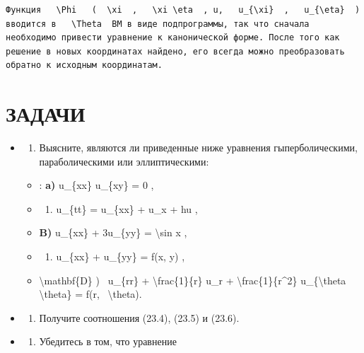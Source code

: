 \documentclass[
]{article}
\providecommand{\tightlist}{%
  \setlength{\itemsep}{0pt}\setlength{\parskip}{0pt}}
\begin{document}
{{\begin{verbatim}
Функция   \Phi   (  \xi  ,   \xi \eta  , u,   u_{\xi}  ,   u_{\eta}  ) вводится в   \Theta  ВМ в виде подпрограммы, так что сначала необходимо привести уравнение к канонической форме. После того как решение в новых координатах найдено, его всегда можно преобразовать обратно к исходным координатам.
\end{verbatim}

\section{ЗАДАЧИ}\label{ux437ux430ux434ux430ux447ux438-7}

\begin{itemize}
\item
  \begin{enumerate}
  \def\labelenumi{\arabic{enumi}.}
  \tightlist
  \item
    Выясните, являются ли приведенные ниже уравнения гыперболическими,
    параболическими или эллиптическими:
  \end{enumerate}

  \begin{itemize}
  \item
    : \textbf{a)} u\_\{xx\} u\_\{xy\} = 0 ,
  \item
    \begin{enumerate}
    \def\labelenumi{\arabic{enumi})}
    \setcounter{enumi}{5}
    \tightlist
    \item
      u\_\{tt\} = u\_\{xx\} + u\_x + hu ,
    \end{enumerate}
  \item
    \textbf{B)} u\_\{xx\} + 3u\_\{yy\} = \textbackslash sin x ,
  \item
    \begin{enumerate}
    \def\labelenumi{\alph{enumi})}
    \setcounter{enumi}{17}
    \tightlist
    \item
      u\_\{xx\} + u\_\{yy\} = f(x, y) ,
    \end{enumerate}
  \item
    \textbackslash mathbf\{D\} ) ~u\_\{rr\} +
    \textbackslash frac\{1\}\{r\} u\_r +
    \textbackslash frac\{1\}\{r\^{}2\} u\_\{\textbackslash theta
    \textbackslash theta\} = f(r, ~\textbackslash theta).
  \end{itemize}
\item
  \begin{enumerate}
  \def\labelenumi{\arabic{enumi}.}
  \setcounter{enumi}{1}
  \tightlist
  \item
    Получите соотношения (23.4), (23.5) и (23.6).
  \end{enumerate}
\item
  \begin{enumerate}
  \def\labelenumi{\arabic{enumi}.}
  \setcounter{enumi}{2}
  \tightlist
  \item
    Убедитесь в том, что уравнение
  \end{enumerate}
\end{itemize}

}}
\end{document}
